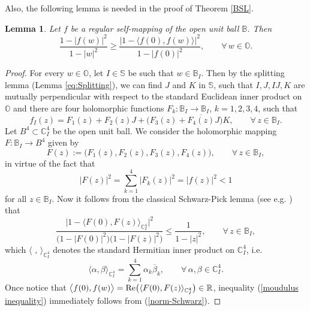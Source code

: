 \documentclass{amsart}
\newtheorem{lemma}[theorem]{Lemma}
\theoremstyle{definition}
\theoremstyle{remark}
\numberwithin{equation}{section}
\begin{document}
Also, the following lemma is needed in the proof of Theorem \ref{BSL}.

\begin{lemma}\label{lem: moudulus inequality}
Let $f$ be a   regular self-mapping of the open unit ball $\mathbb B$. Then
\begin{equation}\label{moudulus inequality}
\frac{1-|f(w)|^2}{1-|w|^2}\geq\frac{\big|1-\big\langle f(0), f(w)\big\rangle\big|^2}{1-|f(0)|^2},\qquad \forall\, w\in\mathbb O.
\end{equation}
\end{lemma}

\begin{proof}
For every $w\in\mathbb O$, let $I\in\mathbb S$ be such that $w\in \mathbb B_I$. Then by the splitting lemma (Lemma \ref{eq:Splitting}), we can find $J$ and $K$ in $\mathbb S$, such that $I, J, IJ, K$ are mutually perpendicular with respect to the standard Euclidean inner product on $\mathbb O$ and there are  four holomorphic functions
$F_k: \mathbb B_I\rightarrow\mathbb B_I$, $k=1,2,3,4$,  such that
\begin{equation}\label{splitting}
f_I(z)=F_1(z)+F_2(z)J+\big(F_3(z)+\overline{F_4(z)}J\big)K, \qquad \forall\, z\in\mathbb B_I.
\end{equation}
Let  $B^4\subset\mathbb C_I^4$ be the open unit ball. We consider the holomorphic mapping $F:\mathbb B_I\rightarrow B^4$ given by
$$F(z):=\big(F_1(z), F_2(z), F_3(z), F_4(z)\big), \qquad \forall\, z\in\mathbb B_I,$$
in virtue of the fact that
$$|F(z)|^2=\sum\limits_{k=1}^4|F_k(z)|^2=|f(z)|^2<1$$
for all $z\in\mathbb B_I$. Now it follows from the classical Schwarz-Pick lemma (see e.g. \cite[Theorem 8.1.4]{Rudin}) that
\begin{equation}\label{norm-Schwarz}
 \frac{\big|1-\big\langle F(0), F(z)\big\rangle_{\mathbb C_{I}^4}\big|^2}{\big(1-|F(0)|^2\big)\big(1-|F(z)|^2\big)}\leq\frac{1}{1-|z|^2},
 \qquad \forall\, z\in\mathbb B_{I},
\end{equation}
which $\langle \,\, ,\,\rangle_{\mathbb C_{I}^4}$ denotes the standard Hermitian inner product on $\mathbb C_{I}^4$, i.e.
$$\langle \alpha, \beta\rangle_{\mathbb C_{I}^4}=\sum_{k=1}^4\alpha_k \overline{\beta}_k, \qquad \forall\, \alpha, \beta\in \mathbb C_{I}^4.$$
Once notice that $\big\langle f(0), f(w)\big\rangle={\rm{Re}}\big(\langle F(0), F(z)\rangle_{\mathbb C_{I}^4}\big)\in\mathbb R$, inequality  (\ref{moudulus inequality}) immediately follows from (\ref{norm-Schwarz}).
\end{proof}
\end{document}
